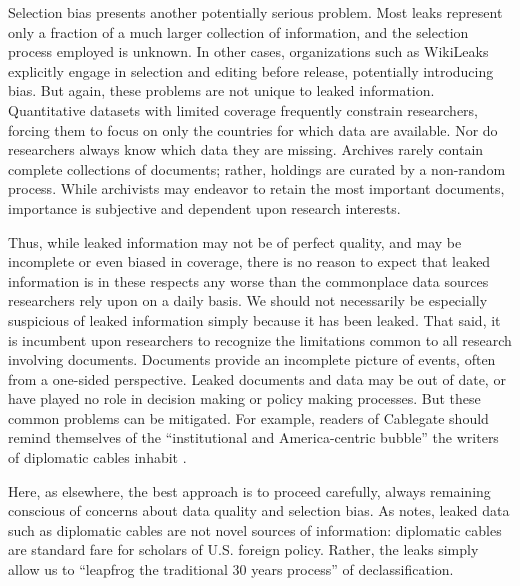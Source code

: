 \documentclass[12pt]{article}
\begin{document}
Selection bias presents another potentially serious problem. Most leaks represent only a fraction 
of a much larger collection of information, and the selection process employed is  
unknown.
In other cases, organizations such as 
WikiLeaks explicitly engage in selection and editing before release, potentially introducing bias.
But again, these problems are not unique to leaked information. Quantitative datasets with limited 
coverage frequently constrain researchers, forcing them to focus on only the countries for which data 
are available. Nor do researchers always know which data they are missing. Archives rarely contain 
complete collections of documents; rather, holdings are curated by a non-random process. While 
archivists may endeavor to retain the most important documents, importance is subjective and dependent 
upon research interests.

Thus, while leaked information may not be of perfect quality, and may be incomplete or even 
biased in coverage, there is no reason to expect that leaked information is in these respects any worse 
than the commonplace data sources researchers rely upon on a daily basis. We should not necessarily 
be especially suspicious of leaked information simply because it has been leaked.
That said, it is incumbent upon researchers to recognize the limitations common to all research involving documents. 
Documents provide an incomplete picture of events, often from a one-sided perspective. 
Leaked documents and data may be out of date, or have played no role in decision making or 
policy making processes.
But these common problems can be mitigated. For example, readers of Cablegate should  
remind themselves of the ``institutional and America-centric bubble'' the writers of diplomatic cables 
inhabit \citep{kinsman2011truth}.

Here, as elsewhere, 
the best approach is to proceed carefully, always remaining conscious of concerns about data quality 
and selection bias. As \citet{western2010american} notes, leaked data such as diplomatic cables are not  
novel sources of information: diplomatic cables are standard fare for scholars of U.S. foreign policy. 
Rather, the leaks simply allow us to ``leapfrog the traditional 30 years process'' of declassification.
\end{document}
